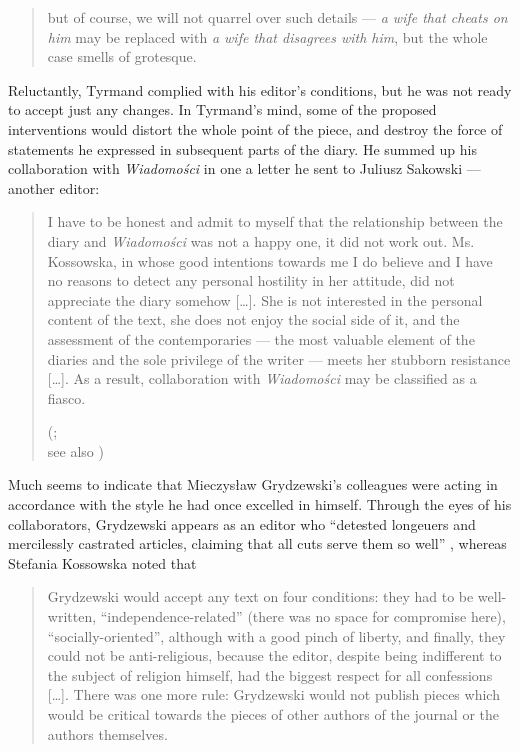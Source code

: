 \begin{paper}
\begin{quote}
but of course, we will not quarrel over such
details --- \emph{a wife that cheats on him} may be replaced with \emph{a
wife that disagrees with him}, but the whole case smells of grotesque.
\begin{flushright}
\citep[22 February 1975]{tyrmand_kor_1966}
\end{flushright}
\end{quote}

\noindent Reluctantly, Tyrmand complied with his
editor's conditions, but he was not ready to accept just any changes. In Tyrmand's mind, some of the proposed
interventions would distort the whole point of the piece, and destroy the force of
statements he expressed in subsequent parts of the diary. He summed up his
collaboration with \emph{Wiadomości} in one a letter he sent to Juliusz Sakowski --- another editor:

\begin{quote}
I have to be honest and admit to myself that the relationship between
the diary and \emph{Wiadomości} was not a happy one, it did not work
out. Ms. Kossowska, in whose good intentions towards me I do believe and
I have no reasons to detect any personal hostility in her attitude, did
not appreciate the diary somehow {[}\ldots{}{]}. She is not interested in the
personal content of the text, she does not enjoy the social side of it,
and the assessment of the contemporaries --- the most valuable element of
the diaries and the sole privilege of the writer --- meets her stubborn
resistance {[}\ldots{}{]}. As a result, collaboration with \emph{Wiadomości
}may be classified as a fiasco.
\begin{flushright}
(\citealt[4 September 1974]{tyrmand_kor_1966}; \\ see also \citealt[90]{tyrmand_listy_2014})
\end{flushright}
\end{quote}

\noindent Much seems to indicate that Mieczysław Grydzewski's colleagues
were acting in accordance with the style he had once excelled in himself.
Through the eyes of his collaborators, Grydzewski appears as an editor who ``detested longeuers and
mercilessly castrated articles, claiming that all cuts serve them so
well'' \citep[179]{goll_ma_1996}, whereas Stefania Kossowska
noted that 

\begin{quote}
Grydzewski would accept any text on four conditions: they
had to be well-written, ``independence-related'' (there was no space for
compromise here), ``socially-oriented'', although with a good pinch of
liberty, and finally, they could not be anti-religious, because the
editor, despite being indifferent to the subject of religion himself,
had the biggest respect for all confessions {[}\ldots{}{]}. There was
one more rule: Grydzewski would not publish pieces which would be
critical towards the pieces of other authors of the journal or the
authors themselves. 
\begin{flushright}
\citep[121]{tyrmand_listy_2014}
\end{flushright}
\end{quote}


\end{paper}
